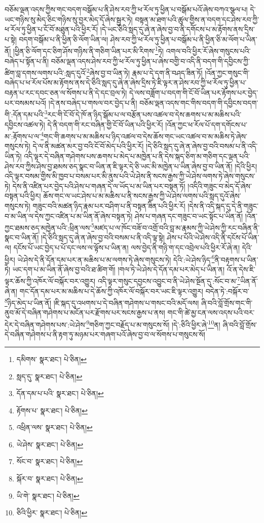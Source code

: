 བཅོམ་ལྡན་འདས་ཀྱིས་གང་བདག་བསྒོམ་པ་ནི་ཤེས་རབ་ཀྱི་ཕ་རོལ་ཏུ་ཕྱིན་པ་བསྒོམ་པའོ་ཞེས་བཀའ་སྩལ་པ། དེ་ཡང་གཉིས་སུ་མེད་ཅིང་གཉིས་སུ་བྱར་མེད་དོ་ཞེས་སྦྱར་ཏེ། བསྟན་མ་ཐག་པའི་ཚུལ་གྱིས་ན་བདག་དང་ཤེས་རབ་ཀྱི་ཕ་རོལ་ཏུ་ཕྱིན་པ་ངོ་བོ་མཐུན་པའི་ཕྱིར་རོ། །དེ་ཡང་ཅིའི་སླད་དུ་ཞེ་ན་ཞེས་བྱ་བ་ནི་དགོངས་པ་མ་རྟོགས་ནས་དྲིས་པ་སྟེ། བདག་བསྒོམ་པ་ནི་ཕྱིན་ཅི་ལོག་ཡིན་ལ། ཤེས་རབ་ཀྱི་ཕ་རོལ་ཏུ་ཕྱིན་པ་བསྒོམ་པ་ནི་ཕྱིན་ཅི་མ་ལོག་པ་ཡིན་ནོ། །ཕྱིན་ཅི་ལོག་དང་ཅིག་ཤོས་གཉིས་ནི་གཅིག་ཡིན་པར་མི་རིགས་\footnote{དམིགས་  སྣར་ཐང་།  པེ་ཅིན། }ཏེ། འགལ་བའི་ཕྱིར་རོ་ཞེས་གསུངས་པའི་བཞེད་པ་སྟོན་པ་ནི། བཅོམ་ལྡན་འདས་ཤེས་རབ་ཀྱི་ཕ་རོལ་ཏུ་ཕྱིན་པ་ཞེས་བགྱི་བ་འདི་ནི་བདག་གི་དབྱིངས་ཀྱི་ཚིག་བླ་དགས་ལགས་པའི་:སླད་དུའོ་\footnote{སླད་དུ་  སྣར་ཐང་།  པེ་ཅིན། }ཞེས་བྱ་བ་ཡིན་ཏེ། རྣམ་པ་དེ་དག་ནི་བཤད་ཟིན་ཏོ། །འོན་ཀྱང་གསུང་གི་བཞེད་པ་ཕ་རོལ་པོས་མ་རྟོགས་ནས་དེ་ཅིའི་སླད་དུ་ཞེ་ན་ཞེས་དྲིས་ཏེ་ཇི་ལྟར་ན་ཤེས་རབ་ཀྱི་ཕ་རོལ་ཏུ་ཕྱིན་པ་བརྟན་པ་རང་དབང་ཅན་ལ་སོགས་པ་ནི་དེ་དང་བྲལ་ཏེ། དེ་ལས་བཟློག་པ་བདག་གི་ངོ་བོ་ཡིན་པར་རྟོགས་པར་བྱེད་པར་བསམས་པའོ། །དེ་ནས་བཞེད་པ་གསལ་བར་བྱེད་པ་ནི། བཅོམ་ལྡན་འདས་གང་གིས་བདག་གི་དབྱིངས་བདག་གི་:དོན་དམ་པའི་\footnote{དོན་དམ་པ་པའི་  སྣར་ཐང་།  པེ་ཅིན། }རང་གི་ངོ་བོ་དེ་ཁོ་ན་ཉིད་སྒོམ་པ་ལ་བརྩོན་པས་འཚལ་བ་དེས་ཆགས་པ་མ་མཆིས་པའི་དབྱིངས་འཚལ་ཏེ། དེ་ནི་བདག་གི་རང་བཞིན་གྱི་ངོ་བོ་ཡིན་པའི་ཕྱིར་རོ། །འོན་ཀྱང་ཕ་རོལ་པོ་དག་དགོངས་པ་མ་:རྟོགས་པ་ལ་\footnote{རྟོགས་པ་  སྣར་ཐང་།  པེ་ཅིན། }གང་གི་ཆགས་པ་མ་མཆིས་པ་ཉིད་འཚལ་བ་དེས་ཆོས་གང་ཡང་འཚལ་བ་མ་མཆིས་ཏེ་ཞེས་གསུངས་ཏེ། དེ་ལ་ནི་མཚན་མར་བྱ་བའི་ངོ་བོ་མེད་པའི་ཕྱིར་རོ། །དེ་ཅིའི་སླད་དུ་ཞེ་ན་ཞེས་བྱ་བའི་བསམ་པ་ནི་འདི་ཡིན་ཏེ། འདི་ལྟར་དེ་བཞིན་གཤེགས་པས་ཆགས་པ་མེད་པ་མཁྱེན་པ་ནི་དེས་སྐད་ཅིག་མ་གཅིག་དང་ལྡན་པའི་ཤེས་རབ་ཀྱིས་ཤེས་བྱ་ཐམས་ཅད་སྣང་བ་ཡིན་ན་ཇི་ལྟར་དེ་ཅི་ཡང་མི་མཁྱེན་པ་ཡིན་ཞེས་བྱ་བ་ཡིན་ནོ། །དེའི་ཕྱིར། འདི་ལྟར་བསམ་གྱིས་མི་ཁྱབ་པ་བསམ་པར་མི་ནུས་པའི་ཡེ་ཤེས་ནི་སངས་རྒྱས་ཀྱི་ཡེ་ཤེས་ལགས་ཏེ་ཞེས་གསུངས་ཏེ། དེས་ནི་འཛིན་པར་བྱེད་པའི་ཤེས་པ་གཞན་དེ་ལ་ཡོད་པ་མ་ཡིན་པར་བསྟན་ཏོ། །འདིའི་གཟུང་བ་མེད་དོ་ཞེས་བསྟན་པའི་ཕྱིར། ཆོས་གང་ལ་ཡང་ཤེས་པ་མ་མཆིས་པ་ནི་སངས་རྒྱས་ཀྱི་ཡེ་ཤེས་ལགས་པའི་སླད་དུའོ་ཞེས་གསུངས་ཏེ། གཟུང་བའི་མཚན་ཉིད་རྣམ་པར་བཤིག་པ་ནི་བསྟན་ཟིན་པའི་ཕྱིར་རོ། །དེས་ནི་འདི་སྐད་དུ་དེ་ནི་གཟུང་བ་མ་ཡིན་ལ་དེས་ཀྱང་འཛིན་པ་མ་ཡིན་ནོ་ཞེས་བསྟན་ཏེ། ཤེས་པ་གཞན་དང་གཟུང་བ་ཡང་སྟོང་པ་ཡིན་ནོ། །འོན་ཀྱང་ཐམས་ཅད་མཁྱེན་པའི་:ཕྲིན་ལས་\footnote{འཕྲིན་ལས་  སྣར་ཐང་།  པེ་ཅིན། }མཛད་པ་ལ་ཁོང་བཟོ་བ་འགྲོ་བའི་བླ་མ་རྣམས་ཀྱི་ཡེ་ཤེས་ཀྱི་རང་བཞིན་ནི་སྣང་བ་ཡིན་ནོ། །དེ་ཅིའི་སླད་དུ་ཞེ་ན་ཞེས་བྱ་བའི་བསམ་པ་ནི་འདི་ལྟ་སྟེ། ཤེས་པ་པོའི་ཡེ་ཤེས་འདི་ནི་དངོས་པོ་ཡིན་ལ། དངོས་པོ་ཡང་བྱེད་པ་པོ་དང་ལས་ལ་ལྟོས་པ་ཡིན་ན། ལས་བྱེད་ནི་གཉི་ག་དང་འབྲེལ་པའི་ཕྱིར་རོ་ཞེ་ན། དེའི་ཕྱིར། ཡེ་ཤེས་དེ་ནི་དོན་དམ་པར་ན་མཆིས་པ་མ་ལགས་ཏེ་ཞེས་གསུངས་ཏེ། དེའི་:ཡེ་ཤེས་ཉིད་\footnote{ཡེ་ཤེས་  སྣར་ཐང་།  པེ་ཅིན། }ནི་བརྟགས་པ་ཡིན་ཏེ། ཡང་དག་པ་མ་ཡིན་ནོ་ཞེས་བྱ་བའི་ཐ་ཚིག་གོ། །གལ་ཏེ་ཡེ་ཤེས་དེ་དོན་དམ་པར་མེད་པ་ཡིན་ན། འོ་ན་དེས་ཇི་ལྟར་ཆོས་ཀྱི་འཁོར་ལོ་བསྐོར་བར་འགྱུར། འདི་ལྟར་གསུང་དབྱངས་འབྱུང་བ་ནི་ཡེ་ཤེས་སྔོན་དུ་:སོང་བ་མ་\footnote{སོང་བ་  སྣར་ཐང་།  པེ་ཅིན། }ཡིན་ནོ་ཞེ་ན། གང་དོན་དམ་པར་མ་མཆིས་པ་དེ་ཆོས་ཀྱི་འཁོར་ལོ་བསྐོར་བར་ཡང་ཇི་ལྟར་འགྱུར། བདེན་ཏེ་:བསྐོར་བ་\footnote{སྐོར་བ་  སྣར་ཐང་།  པེ་ཅིན། }ཉིད་མེད་པ་ཡིན་ནོ། །ཇི་སྐད་དུ་འཕགས་པ་དེ་བཞིན་གཤེགས་པ་གསང་བའི་མདོ་ལས། ཞི་བའི་བློ་གྲོས་གང་གི་ནུབ་མོ་དེ་བཞིན་གཤེགས་པ་མངོན་པར་རྫོགས་པར་སངས་རྒྱས་པ་ནས། གང་གི་ཚེ་མྱ་ངན་ལས་འདས་པའི་བར་དེར་དེ་བཞིན་གཤེགས་པས་:ཡེ་ཤེས་\footnote{ཡི་གེ་  སྣར་ཐང་།  པེ་ཅིན། }གཅིག་ཀྱང་བརྗོད་པ་མ་གསུངས་སོ། །དེ་:ཅིའི་ཕྱིར་ཞེ་\footnote{ཅིའི་ཕྱིར་  སྣར་ཐང་།  པེ་ཅིན། }ན། ཞི་བའི་བློ་གྲོས་དེ་བཞིན་གཤེགས་པ་ནི་རྟག་ཏུ་མཉམ་པར་གཞག་པའོ་ཞེས་བྱ་བ་ལ་སོགས་པ་གསུངས་སོ། 